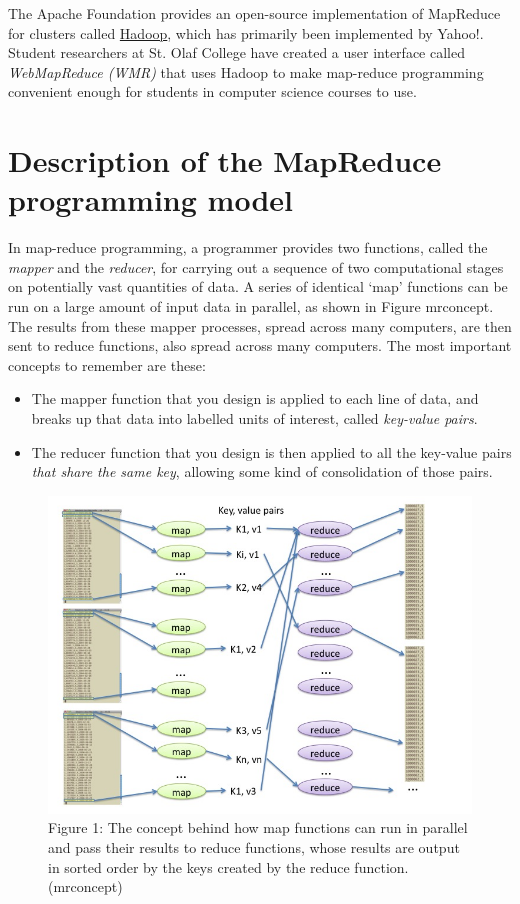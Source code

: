 \documentclass[letterpaper,10pt,openany,oneside]{sphinxmanual}
\begin{document}
The Apache Foundation provides an open-source implementation of
MapReduce for clusters called
\href{http://hadoop.apache.org/core/}{Hadoop}, which has primarily
been implemented by Yahoo!. Student researchers at St. Olaf College
have created a user interface called \emph{WebMapReduce (WMR)} that uses
Hadoop to make map-reduce programming convenient enough for
students in computer science courses to use.


\section{Description of the MapReduce programming model}
\label{MapReduceIntro/MapReduceIntro:description-of-the-mapreduce-programming-model}
In map-reduce programming, a programmer provides two functions,
called the \emph{mapper} and the \emph{reducer}, for carrying out a sequence
of two computational stages on potentially vast quantities of data.
A series of identical `map' functions can be run on a large amount
of input data in parallel, as shown in Figure mrconcept. The
results from these mapper processes, spread across many computers,
are then sent to reduce functions, also spread across many
computers. The most important concepts to remember are these:
\begin{itemize}
\item {} 
The mapper function that you design is applied to each line of
data, and breaks up that data into labelled units of interest,
called \emph{key-value pairs}.

\item {} 
The reducer function that you design is then applied to all the
key-value pairs \emph{that share the same key}, allowing some kind of
consolidation of those pairs.

\end{itemize}
\begin{figure}[htbp]
\centering
\capstart

\includegraphics{Figure1.jpg}
\caption{Figure 1: The concept behind how map functions can run in parallel and
pass their results to reduce functions, whose results are output in
sorted order by the keys created by the reduce function.(mrconcept)}\end{figure}
\end{document}
